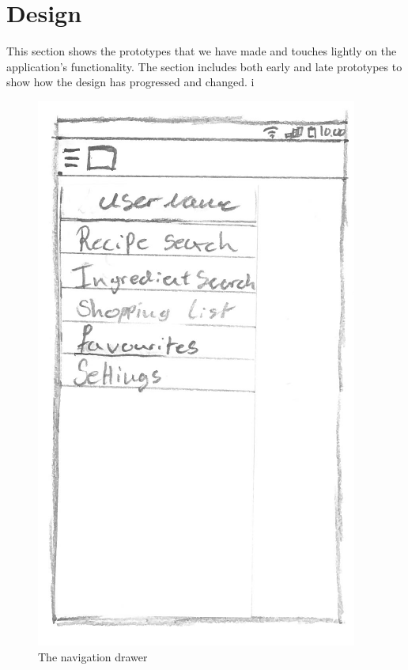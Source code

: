 \section{Design}
This section shows the prototypes that we have made and touches lightly on the application's functionality. The section includes both early and late prototypes to show how the design has progressed and changed. 
i

\begin{figure}[H]
\begin{minipage}[b]{0.5\columnwidth}
\centering
\includegraphics[width=0.7\columnwidth]{img/prototypes/navigation_drawer.pdf}
\caption{The navigation drawer\label{fig:navdrawer}}
\end{minipage}
\hspace{0.5cm}
\begin{minipage}[b]{0.5\columnwidth}
\centering

\end{minipage}
\end{figure}

